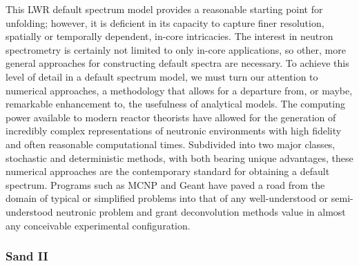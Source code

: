 This LWR default spectrum model provides a reasonable starting point for unfolding; however, it is deficient in its capacity to capture finer resolution, spatially or temporally dependent, in-core intricacies.
The interest in neutron spectrometry is certainly not limited to only in-core applications, so other, more general approaches for constructing default spectra are necessary.
To achieve this level of detail in a default spectrum model, we must turn our attention to numerical approaches, a methodology that allows for a departure from, or maybe, remarkable enhancement to, the usefulness of analytical models.
The computing power available to modern reactor theorists have allowed for the generation of incredibly complex representations of neutronic environments with high fidelity and often reasonable computational times.
Subdivided into two major classes, stochastic and deterministic methods, with both bearing unique advantages, these numerical approaches are the contemporary standard for obtaining a default spectrum.
Programs such as MCNP and Geant have paved a road from the domain of typical or simplified problems into that of any well-understood or semi-understood neutronic problem and grant deconvolution methods value in almost any conceivable experimental configuration.





\subsubsection{Sand II}

